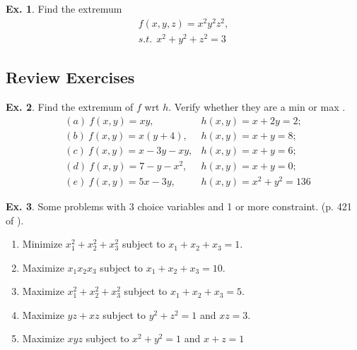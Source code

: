 \documentclass[10pt,a4paper]{book}
\theoremstyle{definition}\newtheorem{definition}{Definition}
\theoremstyle{definition}\newtheorem{fact}{Fact}
\theoremstyle{definition}\newtheorem{ex}{Ex.}
\theoremstyle{definition}\newtheorem{project}{Project}
\theoremstyle{definition}\newtheorem{problem}{Problem}
\theoremstyle{definition}\newtheorem{example}{Example}
\numberwithin{theorem}{chapter}
\numberwithin{corollary}{chapter}
\numberwithin{assumption}{chapter}
\numberwithin{definition}{chapter}
\numberwithin{prop}{chapter}
\numberwithin{notation}{chapter}
\numberwithin{problem}{chapter}
\numberwithin{example}{chapter}
\numberwithin{fact}{chapter}
\numberwithin{ex}{chapter}
\begin{document}
	\begin{ex}
		Find the extremum
		\begin{align*}
			f(x,y,z) = x^2 y^2 z^2, \\
			s.t. \ \ x^2 + y^2 + z^2 = 3
		\end{align*}
	\end{ex}
	
	\subsection{Review Exercises}
	\begin{ex}
		Find the extremum of $f$ wrt $h$. Verify whether they are a min or max \citep{chiang1984fundamental}.
		\begin{align*}
			& (a) \ f(x,y) = xy,          & h(x,y) = x + 2y = 2;            \\
			& (b) \ f(x,y) = x(y+4),      & h(x,y) = x + y = 8;             \\
			& (c) \ f(x,y) = x - 3y - xy, & h(x,y) = x + y = 6;             \\
			& (d) \ f(x,y) = 7 - y - x^2, & h(x,y) = x + y =0;            \\
			& (e) \ f(x,y) = 5x - 3y, & h(x,y) = x^2 + y^2 = 136
		\end{align*}
	\end{ex}
	
	\begin{ex}
		Some problems with 3 choice variables and 1 or more constraint. (p. 421 of \citet{simon1994mathematics}).
		\begin{enumerate}[label=(\alph*)]
			
			\item Minimize $x_1^2+x_2^2+x_3^2$ subject to $x_1+x_2+x_3=1$.
			
			\item  Maximize $x_1x_2x_3$ subject to $x_1+x_2+x_3=10$.
						
			\item Maximize $x_1^2+x_2^2+x_3^2$ subject to $x_1+x_2+x_3=5$.
			
			\item Maximize $yz + xz$ subject to $y^2 + z^2 = 1$ and $xz=3$.
			
			\item Maximize $xyz$ subject to $x^2 + y^2 = 1$ and $x + z = 1$
		\end{enumerate}
	\end{ex}
	
\end{document}
